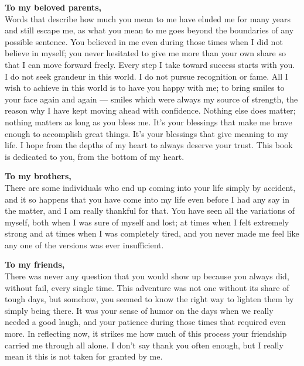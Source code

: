 \thispagestyle{empty} %

\begin{itshape}
\raggedright

\noindent \textbf{\large To my beloved parents,} \\
\vspace{0.5em}
\hspace{1.5em}Words that describe how much you mean to me have eluded me for many years and still escape me, as what you mean to me goes beyond the boundaries of any possible sentence. You believed in me even during those times when I did not believe in myself; you never hesitated to give me more than your own share so that I can move forward freely. Every step I take toward success starts with you.
    I do not seek grandeur in this world. I do not pursue recognition or fame. All I wish to achieve in this world is to have you happy with me; to bring smiles to your face again and again — smiles which were always my source of strength, the reason why I have kept moving ahead with confidence. Nothing else does matter; nothing matters as long as you bless me. It's your blessings that make me brave enough to accomplish great things. It's your blessings that give meaning to my life. I hope from the depths of my heart to always deserve your trust.
    This book is dedicated to you, from the bottom of my heart.

\vspace{2em}

\noindent \textbf{\large To my brothers,} \\
\vspace{0.5em}
\hspace{1.5em}There are some individuals who end up coming into your life simply by accident, and it so happens that you have come into my life even before I had any say in the matter, and I am really thankful for that. You have seen all the variations of myself, both when I was sure of myself and lost; at times when I felt extremely strong and at times when I was completely tired, and you never made me feel like any one of the versions was ever insufficient.

\vspace{2em}

\noindent \textbf{\large To my friends,} \\
\vspace{0.5em}
\hspace{1.5em}There was never any question that you would show up because you always did, without fail, every single time. This adventure was not one without its share of tough days, but somehow, you seemed to know the right way to lighten them by simply being there. It was your sense of humor on the days when we really needed a good laugh, and your patience during those times that required even more. In reflecting now, it strikes me how much of this process your friendship carried me through all alone. I don’t say thank you often enough, but I really mean it this is not taken for granted by me.



\end{itshape}
